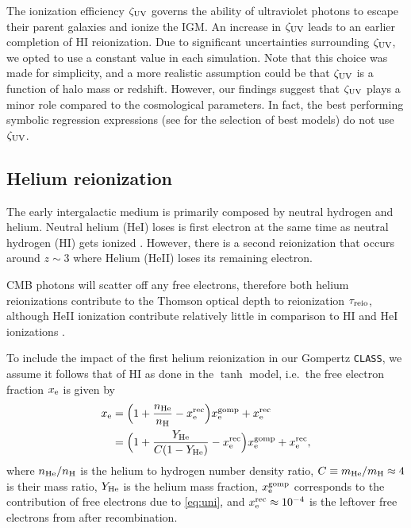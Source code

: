The ionization efficiency $\zeta_\mathrm{UV}$ governs the ability of ultraviolet
photons to escape their parent galaxies and ionize the IGM. An increase
in $\zeta_\mathrm{UV}$ leads to an earlier completion of HI reionization.
Due to significant uncertainties surrounding $\zeta_\mathrm{UV}$, we opted to use
a constant value in each simulation.
Note that this choice was made for simplicity, and a more realistic
assumption could be that $\zeta_\mathrm{UV}$ is a function of halo mass
\cite{Park2019} or redshift.
However, our findings suggest that $\zeta_\mathrm{UV}$ plays a minor role compared
to the cosmological parameters.
In fact, the best performing symbolic regression expressions (see
 for the selection of best models) do not use
$\zeta_\mathrm{UV}$.


\subsection*{Helium reionization}
\label{ssec:helium}

The early intergalactic medium is primarily composed by neutral hydrogen
and helium.
Neutral helium (HeI) loses is first electron at the same time as neutral
hydrogen (HI) gets ionized \cite{Trac2007}.
However, there is a second reionization that occurs around $z\sim3$
where Helium (HeII) loses its remaining electron.

CMB photons will scatter off any free electrons, therefore both helium
reionizations contribute to the Thomson optical depth to reionization
$\tau_{\mathrm{reio}}$, although HeII ionization contribute relatively little in
comparison to HI and HeI ionizations \cite{Liu2016}.

To include the impact of the first helium reionization in our Gompertz
\texttt{CLASS}, we assume it follows that of HI as done in the $\tanh$
model, i.e.\ the free electron fraction $x_{\mathrm{e}}$ is given by
%
\begin{align}
\label{eq:xe_H_He}
x_\e
&= \Bigl(1 + \frac{n_\He}{n_\mathrm{H}} - x^\rec_\e\Bigr) x_\e^\gomp
  + x^\rec_\e
\nonumber\\
%
&= \Bigl(1 + \frac{Y_\He}{C (1 - Y_\He)} - x^\rec_\e\Bigr) x_\e^\gomp
  + x^\rec_\e,
\end{align}
%
where $n_{\mathrm{He}} / n_\mathrm{H}$ is the helium to hydrogen number density
ratio, $C \equiv m_{\mathrm{He}} / m_\mathrm{H} \approx 4$ is their mass ratio,
$Y_{\mathrm{He}}$ is the helium mass fraction, $x_{\mathrm{e}}^{\mathrm{gomp}}$ corresponds to the
contribution of free electrons due to \cref{eq:uni}, and $x^{\mathrm{rec}}_{\mathrm{e}}
\approx 10^{-4}$ is the leftover free electrons from after
recombination.

